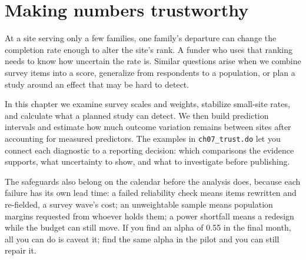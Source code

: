 \documentclass[
    a4paper,
    fontsize=10pt,
    twoside=true,
    numbers=noenddot,
]{kaobook}
\begin{document}

\chapter{Making numbers trustworthy}\label{ch:trust}

At a site serving only a few families, one family's departure can change the completion rate enough to alter the site's rank. A funder who uses that ranking needs to know how uncertain the rate is. Similar questions arise when we combine survey items into a score, generalize from respondents to a population, or plan a study around an effect that may be hard to detect.

In this chapter we examine survey scales and weights, stabilize small-site rates, and calculate what a planned study can detect. We then build prediction intervals and estimate how much outcome variation remains between sites after accounting for measured predictors. The examples in \texttt{ch07\_trust.do} let you connect each diagnostic to a reporting decision: which comparisons the evidence supports, what uncertainty to show, and what to investigate before publishing.

The safeguards also belong on the calendar before the analysis does, because each failure has its own lead time: a failed reliability check means items rewritten and re-fielded, a survey wave's cost; an unweightable sample means population margins requested from whoever holds them; a power shortfall means a redesign while the budget can still move. If you find an alpha of 0.55 in the final month, all you can do is caveat it; find the same alpha in the pilot and you can still repair it.
\end{document}
